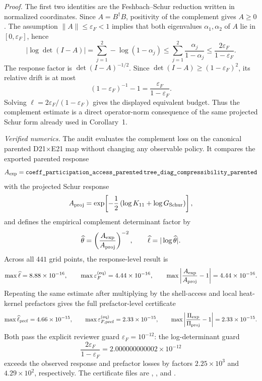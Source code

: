 \documentclass[aps,prd,onecolumn,notitlepage,nofootinbib,superscriptaddress,11pt,floatfix]{revtex4-2}
\begin{document}
\emph{Proof.}
The first two identities are the Feshbach--Schur reduction written in normalized coordinates.  Since \(A=B^\dagger B\), positivity of the complement gives \(A\ge0\).  The assumption \(\|A\|\le\varepsilon_F<1\) implies that both eigenvalues \(\alpha_1,\alpha_2\) of \(A\) lie in \([0,\varepsilon_F]\), hence
\[
|\log\det(I-A)|
=
\sum_{j=1}^2-\log(1-\alpha_j)
\le
\sum_{j=1}^2\frac{\alpha_j}{1-\alpha_j}
\le
\frac{2\varepsilon_F}{1-\varepsilon_F}.
\]
The response factor is \(\det(I-A)^{-1/2}\).  Since \(\det(I-A)\ge(1-\varepsilon_F)^2\), its relative drift is at most
\[
(1-\varepsilon_F)^{-1}-1
=
\frac{\varepsilon_F}{1-\varepsilon_F}.
\]
Solving \(\ell=2\varepsilon_F/(1-\varepsilon_F)\) gives the displayed equivalent budget.  Thus the complement estimate is a direct operator-norm consequence of the same projected Schur form already used in Corollary~1.

\emph{Verified numerics.}
The audit  evaluates the complement loss on the canonical parented D21\(\times\)E21 map without changing any observable policy.  It compares the exported parented response
\[
A_{\rm exp}
=
\texttt{coeff\_participation\_access\_parented}\,
\texttt{tree\_diag\_compressibility\_parented}
\]
with the projected Schur response
\[
A_{\rm proj}
=
\exp\!\left[-\frac12\left(\log K_{11}+\log G_{\rm Schur}\right)\right],
\]
and defines the empirical complement determinant factor by
\[
\widehat\theta
=
\left(\frac{A_{\rm exp}}{A_{\rm proj}}\right)^{-2},
\qquad
\widehat\ell=|\log\widehat\theta|.
\]
Across all \(441\) grid points, the response-level result is
\[
\max\widehat\ell=8.88\times10^{-16},
\qquad
\max\varepsilon_F^{\rm(eq)}=4.44\times10^{-16},
\qquad
\max\left|\frac{A_{\rm exp}}{A_{\rm proj}}-1\right|
=4.44\times10^{-16}.
\]
Repeating the same estimate after multiplying by the shell-access and local heat-kernel prefactors gives the full prefactor-level certificate
\[
\max\widehat\ell_{\rm pref}=4.66\times10^{-15},
\qquad
\max\varepsilon_{F,{\rm pref}}^{\rm(eq)}=2.33\times10^{-15},
\qquad
\max\left|\frac{\Pi_{\rm exp}}{\Pi_{\rm proj}}-1\right|
=2.33\times10^{-15}.
\]
Both pass the explicit reviewer guard \(\varepsilon_F=10^{-12}\): the log-determinant guard
\[
\frac{2\varepsilon_F}{1-\varepsilon_F}=2.000000000002\times10^{-12}
\]
exceeds the observed response and prefactor losses by factors \(2.25\times10^3\) and \(4.29\times10^2\), respectively.  The certificate files are , , and .
\end{document}
